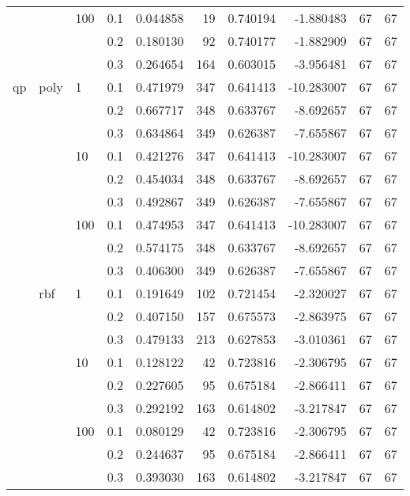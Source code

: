 \begin{table}[h!]
\begin{tabular}{llllrrrrrr}
   &     & 100 & 0.1 &  0.044858 &      19 &  0.740194 &  -1.880483 &          67 &        67 \\
   &     &     & 0.2 &  0.180130 &      92 &  0.740177 &  -1.882909 &          67 &        67 \\
   &     &     & 0.3 &  0.264654 &     164 &  0.603015 &  -3.956481 &          67 &        67 \\
qp & poly & 1   & 0.1 &  0.471979 &     347 &  0.641413 & -10.283007 &          67 &        67 \\
   &     &     & 0.2 &  0.667717 &     348 &  0.633767 &  -8.692657 &          67 &        67 \\
   &     &     & 0.3 &  0.634864 &     349 &  0.626387 &  -7.655867 &          67 &        67 \\
   &     & 10  & 0.1 &  0.421276 &     347 &  0.641413 & -10.283007 &          67 &        67 \\
   &     &     & 0.2 &  0.454034 &     348 &  0.633767 &  -8.692657 &          67 &        67 \\
   &     &     & 0.3 &  0.492867 &     349 &  0.626387 &  -7.655867 &          67 &        67 \\
   &     & 100 & 0.1 &  0.474953 &     347 &  0.641413 & -10.283007 &          67 &        67 \\
   &     &     & 0.2 &  0.574175 &     348 &  0.633767 &  -8.692657 &          67 &        67 \\
   &     &     & 0.3 &  0.406300 &     349 &  0.626387 &  -7.655867 &          67 &        67 \\
   & rbf & 1   & 0.1 &  0.191649 &     102 &  0.721454 &  -2.320027 &          67 &        67 \\
   &     &     & 0.2 &  0.407150 &     157 &  0.675573 &  -2.863975 &          67 &        67 \\
   &     &     & 0.3 &  0.479133 &     213 &  0.627853 &  -3.010361 &          67 &        67 \\
   &     & 10  & 0.1 &  0.128122 &      42 &  0.723816 &  -2.306795 &          67 &        67 \\
   &     &     & 0.2 &  0.227605 &      95 &  0.675184 &  -2.866411 &          67 &        67 \\
   &     &     & 0.3 &  0.292192 &     163 &  0.614802 &  -3.217847 &          67 &        67 \\
   &     & 100 & 0.1 &  0.080129 &      42 &  0.723816 &  -2.306795 &          67 &        67 \\
   &     &     & 0.2 &  0.244637 &      95 &  0.675184 &  -2.866411 &          67 &        67 \\
   &     &     & 0.3 &  0.393030 &     163 &  0.614802 &  -3.217847 &          67 &        67 \\
\bottomrule
\end{tabular}
\end{table}

